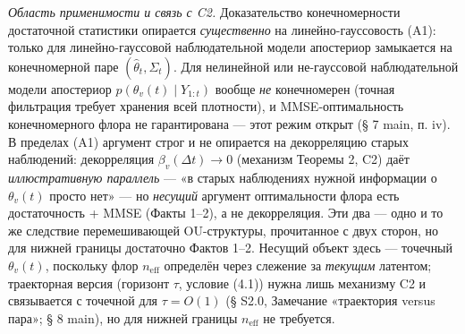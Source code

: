 \documentclass[12pt]{iopart}
\begin{document}
\emph{Область применимости и связь с C2.} Доказательство конечномерности достаточной статистики опирается \emph{существенно} на линейно-гауссовость (A1): только для линейно-гауссовой наблюдательной модели апостериор замыкается на конечномерной паре \((\hat\theta_t,\Sigma_t)\). Для нелинейной или не-гауссовой наблюдательной модели апостериор \(p(\theta_v(t)\mid Y_{1:t})\) вообще \emph{не} конечномерен (точная фильтрация требует хранения всей плотности), и MMSE-оптимальность конечномерного флора не гарантирована --- этот режим открыт (§ 7 main, п. iv). В пределах (A1) аргумент строг и не опирается на декорреляцию старых наблюдений: декорреляция \(\beta_v(\Delta t)\to 0\) (механизм Теоремы 2, C2) даёт \emph{иллюстративную параллель} --- «в старых наблюдениях нужной информации о \(\theta_v(t)\) просто нет» --- но \emph{несущий} аргумент оптимальности флора есть достаточность + MMSE (Факты 1--2), а не декорреляция. Эти два --- одно и то же следствие перемешивающей OU-структуры, прочитанное с двух сторон, но для нижней границы достаточно Фактов 1--2. Несущий объект здесь --- точечный \(\theta_v(t)\), поскольку флор \(n_{\text{eff}}\) определён через слежение за \emph{текущим} латентом; траекторная версия (горизонт \(\tau\), условие (4.1)) нужна лишь механизму C2 и связывается с точечной для \(\tau=O(1)\) (§ S2.0, Замечание «траектория versus пара»; § 8 main), но для нижней границы \(n_{\text{eff}}\) не требуется.
\end{document}
